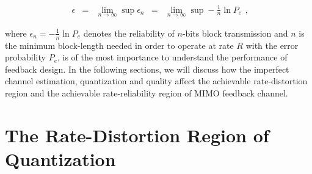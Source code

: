 \documentclass[10pt,fleqn, twocolumn]{IEEEtran}
\begin{document}
\begin{equation}
\begin{array}{rcccl}
\epsilon&=&\lim\limits_{n\rightarrow\infty}\sup
\epsilon_{n}&=&\lim\limits_{n\rightarrow\infty}\sup-\frac{1}{n}\ln
P_{e}
\end{array},
\end{equation}

\noindent where $\epsilon_{n}=-\frac{1}{n}\ln P_{e}$ denotes the
reliability of $n$-bits block transmission and $n$ is the minimum
block-length needed in order to operate at rate $R$ with the error
probability $P_{e}$, is of the most importance to understand the
performance of feedback design. In the following sections, we will
discuss how the imperfect channel estimation, quantization and
quality affect the achievable rate-distortion region and the
achievable rate-reliability region of MIMO feedback channel.

\section{The Rate-Distortion Region of Quantization}
\end{document}
